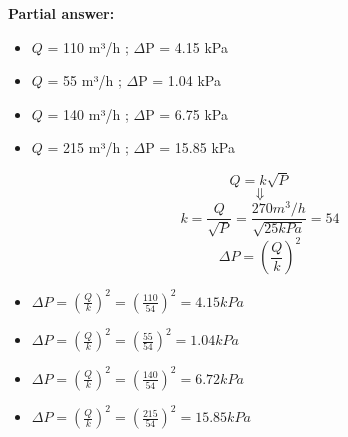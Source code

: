 





\noindent
{\bf Partial answer:}

\begin{itemize}
\item{} $Q$ = 110 m³/h ; $\Delta$P = 4.15 kPa
\vskip 5pt
\item{} $Q$ = 55 m³/h ; $\Delta$P = 1.04 kPa
\vskip 5pt
\item{} $Q$ = 140 m³/h ; $\Delta$P = 6.75 kPa
\vskip 5pt
\item{} $Q$ = 215 m³/h ; $\Delta$P = 15.85 kPa
\end{itemize}







$$Q = k \sqrt{P}$$
$$\Downarrow$$
$$k =\frac{Q}{\sqrt{P}}=\frac{270 m^3/h}{\sqrt{25kPa}}=54$$
\vskip 2cm
$$\Delta P =\left(\frac{Q}{k}\right)^2$$


\begin{itemize}
	\item $\Delta P =\left(\frac{Q}{k}\right)^2=\left(\frac{110}{54}\right)^2=4.15kPa$
	\item $\Delta P =\left(\frac{Q}{k}\right)^2=\left(\frac{55}{54}\right)^2=1.04kPa$
	\item $\Delta P =\left(\frac{Q}{k}\right)^2=\left(\frac{140}{54}\right)^2=6.72kPa$
	\item $\Delta P =\left(\frac{Q}{k}\right)^2=\left(\frac{215}{54}\right)^2=15.85kPa$
\end{itemize}





